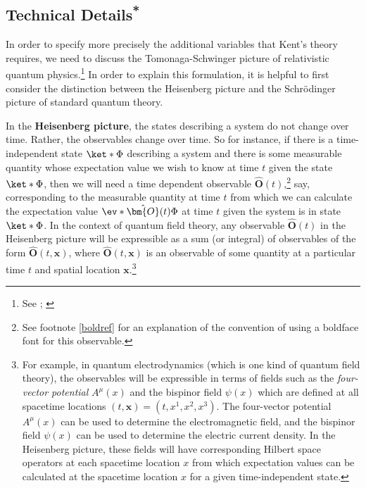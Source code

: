 \documentclass[12pt]{report}
\begin{document}
\subsection{Technical Details\textsuperscript{*}\label{AdditionalVariablesDetails}}  
In order to specify more precisely the additional variables that Kent's theory requires, we need to discuss the Tomonaga-Schwinger picture of relativistic quantum physics.\footnote{See \cite{SchwingerJulianI}; \cite{TomonagaI}} In order to explain this formulation, it is helpful to first consider  the distinction between the Heisenberg picture and the Schr\"{o}dinger picture of standard quantum theory. 

In the \textbf{Heisenberg picture}, the states describing a system do not change over time. Rather, the observables change over time. So for instance, if there is a time-independent state $\ket*{\Phi}$ describing a system and there is some measurable quantity whose expectation value we wish to know at time $t$ given the state $\ket*{\Phi}$, %
%
 then we will need a time dependent observable $\hat{\bm{O}}(t)$,\footnote{See footnote \ref{boldref} for an explanation of the convention of using a boldface font for this observable.} say, corresponding to the measurable quantity at time $t$ from which we can calculate the expectation value $\ev*{\hat{\bm{O}}(t)}{\Phi}$ at time $t$  given the system is in state $\ket*{\Phi}$. In the context of quantum field theory, any observable $\hat{\bm{O}}(t)$ %
  in the Heisenberg picture will be expressible as a sum (or integral) of observables of the form $\hat{\bm{O}}(t, \bm{x})$, where $\hat{\bm{O}}(t, \bm{x})$ %
   is an observable of some quantity at a particular time $t$ and spatial location $\bm{x}$.\footnote{For example, in quantum electrodynamics (which is one kind of quantum field theory), the observables will be expressible in terms of fields such as the \emph{four-vector potential}  $A^\mu(x)$  %
   and the bispinor field $\psi(x)$ %
    which are defined at all spacetime locations $(t, \bm{x})=(t, x^1, x^2, x^3)$. The four-vector potential $A^\mu(x)$ can be used to determine the electromagnetic field, and the bispinor field $\psi(x)$ can be used to determine the electric current density. In the Heisenberg picture, these fields will have corresponding Hilbert space operators at each spacetime location $x$ from which expectation values can be calculated at the spacetime location $x$ for a given time-independent state.}
\end{document}
